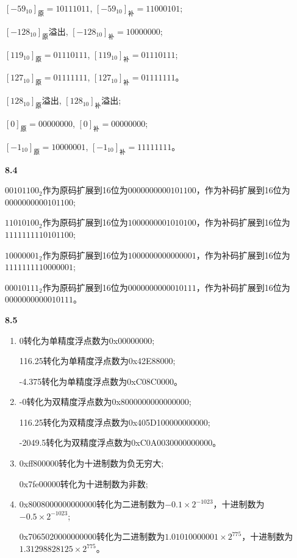 \documentclass[UTF8]{report}
\begin{document}
$[-59_{10}]_{\text{原}} = 10111011$, $[-59_{10}]_{\text{补}} = 11000101$;

$[-128_{10}]_{\text{原}}$溢出, $[-128_{10}]_{\text{补}} = 10000000$;

$[119_{10}]_{\text{原}} = 01110111$, $[119_{10}]_{\text{补}} = 01110111$;

$[127_{10}]_{\text{原}} = 01111111$, $[127_{10}]_{\text{补}} = 01111111$。

$[128_{10}]_{\text{原}}$溢出, $[128_{10}]_{\text{补}}$溢出;

$[0]_{\text{原}} = 00000000$, $[0]_{\text{补}} = 00000000$;

$[-1_{10}]_{\text{原}} = 10000001$, $[-1_{10}]_{\text{补}} = 11111111$。

\noindent
\textbf{8.4}

$00101100_2$作为原码扩展到16位为$0000000000101100$，作为补码扩展到16位为$0000000000101100$;

$11010100_2$作为原码扩展到16位为$1000000001010100$，作为补码扩展到16位为$1111111110101100$;

$10000001_2$作为原码扩展到16位为$1000000000000001$，作为补码扩展到16位为$1111111110000001$;

$00010111_2$作为原码扩展到16位为$0000000000010111$，作为补码扩展到16位为$0000000000010111$。

\noindent
\textbf{8.5}

\begin{enumerate}[label=(\arabic*)]
    \item 0转化为单精度浮点数为0x00000000;
    
    116.25转化为单精度浮点数为0x42E88000;

    -4.375转化为单精度浮点数为0xC08C0000。

    \item -0转化为双精度浮点数为0x8000000000000000;
    
    116.25转化为双精度浮点数为0x405D100000000000;

    -2049.5转化为双精度浮点数为0xC0A0030000000000。

    \item 0xff800000转化为十进制数为负无穷大;
    
    0x7fe00000转化为十进制数为非数;

    \item 0x8008000000000000转化为二进制数为$-0.1 \times 2^{-1023}$，十进制数为$-0.5 \times 2^{-1023}$;
    
    0x7065020000000000转化为二进制数为$1.01010000001 \times 2^{775}$，十进制数为$1.31298828125 \times 2^{775}$。
\end{enumerate}
\end{document}
